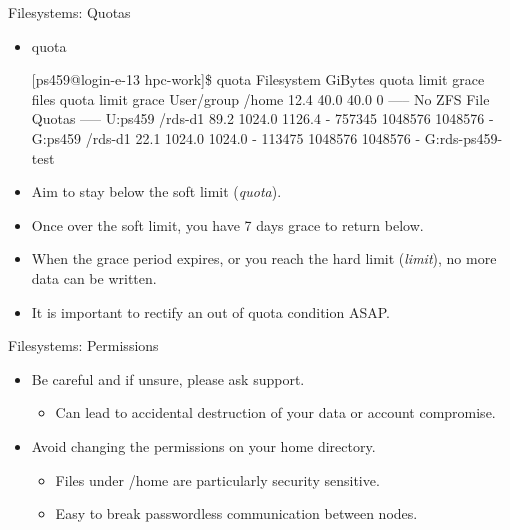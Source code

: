 \begin{frame}[fragile]{Filesystems: Quotas}
\begin{itemize}
\item{quota}
\begin{semiverbatim}
\tiny
[ps459@login-e-13 hpc-work]\$ quota
Filesystem  GiBytes    quota   limit   grace    files    quota    limit   grace User/group
/home          12.4     40.0    40.0       0    ----- No ZFS File Quotas  ----- U:ps459
/rds-d1        89.2   1024.0  1126.4       -   757345  1048576  1048576       - G:ps459
/rds-d1        22.1   1024.0  1024.0       -   113475  1048576  1048576       - G:rds-ps459-test
\end{semiverbatim}
\item<1-|handout:1->{\alert{Aim to stay below the soft limit (\emph{quota}).}}
\item<2-|handout:1->{\alert{Once over the soft limit, you have 7 days grace to return below.}}
\item<3-|handout:2>{\alert{When the grace period expires, or you reach the hard limit (\emph{limit}), no more data can be written.}}
\item<4-|handout:2>{\alert{It is important to rectify an out of quota condition ASAP.}}
\end{itemize}
\end{frame}

\begin{frame}{Filesystems: Permissions}
\begin{itemize}
\item{\color{red}Be careful and if unsure, please ask support.}
\begin{itemize}
\item{Can lead to \alert{accidental destruction} of your data or \alert{account compromise}.}
\end{itemize}
\item{Avoid changing the permissions on your home directory.}
\begin{itemize}
\item{Files under /home are particularly security sensitive.}
\item{Easy to break passwordless communication between nodes.}
\end{itemize}
\end{itemize}
\end{frame}

